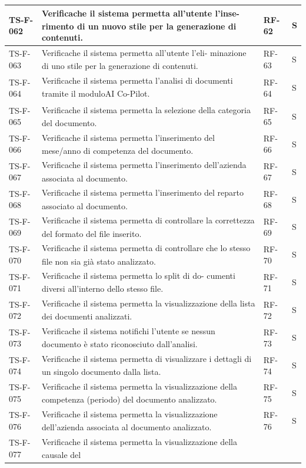 \documentclass[a4paper,11pt]{article}
\renewcommand{\G}{\texorpdfstring{\textsubscript{\scalebox{0.6}{\textbf{G}}}\xspace}{ G}}
\begin{document}
\begin{longtable}{|p{2.2cm}|p{8.3cm}|p{2cm}|p{1.5cm}|}
TS-F-062 & Verifica\G che il sistema permetta all’utente l’inse-
rimento di un nuovo stile per la generazione
di contenuti. & RF-62 & S \\ \hline
TS-F-063 & Verifica\G che il sistema permetta all’utente l’eli-
minazione di uno stile per la generazione di
contenuti. & RF-63 & S \\ \hline
TS-F-064 & Verifica\G che il sistema permetta l’analisi di
documenti tramite il modulo\G AI Co-Pilot\G. & RF-64 & S \\ \hline
TS-F-065 & Verifica\G che il sistema permetta la selezione della categoria del
documento. & RF-65 & S \\ \hline
TS-F-066 & Verifica\G che il sistema permetta l’inserimento del
mese/anno di competenza del documento. & RF-66 & S \\ \hline
TS-F-067 & Verifica\G che il sistema permetta l’inserimento
dell’azienda associata al documento. & RF-67 & S \\ \hline
TS-F-068 & Verifica\G che il sistema permetta l’inserimento del
reparto associato al documento. & RF-68 & S \\ \hline
TS-F-069 & Verifica\G che il sistema permetta di controllare la
correttezza del formato del file inserito. & RF-69 & S \\ \hline
TS-F-070 & Verifica\G che il sistema permetta di controllare che lo
stesso file non sia già stato analizzato. & RF-70 & S \\ \hline
TS-F-071 & Verifica\G che il sistema permetta lo split di do-
cumenti diversi all’interno dello stesso
file. & RF-71 & S \\ \hline
TS-F-072 & Verifica\G che il sistema permetta la visualizzazione della lista dei
documenti analizzati. & RF-72 & S \\ \hline
TS-F-073 & Verifica\G che il sistema notifichi l’utente se nessun
documento è stato riconosciuto dall’analisi. & RF-73 & S \\ \hline
TS-F-074 & Verifica\G che il sistema permetta di visualizzare i
dettagli di un singolo documento dalla lista. & RF-74 & S \\ \hline
TS-F-075 & Verifica\G che il sistema permetta la visualizzazione della competenza
(periodo) del documento analizzato. & RF-75 & S \\ \hline
TS-F-076 & Verifica\G che il sistema permetta la visualizzazione dell’azienda
associata al documento analizzato. & RF-76 & S \\ \hline
TS-F-077 & Verifica\G che il sistema permetta la visualizzazione della causale del

\end{longtable}
\end{document}
